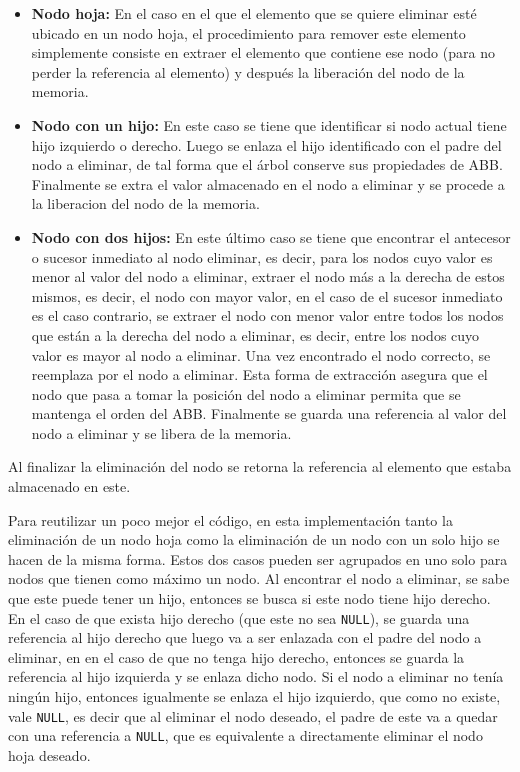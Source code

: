 \documentclass[titlepage,a4paper]{article}
\begin{document}
\begin{itemize}
	\item \textbf{Nodo hoja:} En el caso en el que el elemento que
			se quiere eliminar esté ubicado en un nodo hoja, el procedimiento para
			remover este elemento simplemente consiste en extraer el elemento que
			contiene ese nodo (para no perder la referencia al elemento) y después
			la liberación del nodo de la memoria.
		\item \textbf{Nodo con un hijo:} En este caso se tiene que identificar si
			nodo actual tiene hijo izquierdo o derecho. Luego se enlaza el hijo
			identificado con el padre del nodo a eliminar, de tal forma que el árbol
			conserve sus propiedades de ABB. Finalmente se extra el valor almacenado
			en el nodo a eliminar y se procede a la liberacion del nodo de la memoria.
		\item \textbf{Nodo con dos hijos:} En este último caso se tiene que
			encontrar el antecesor o sucesor inmediato al nodo eliminar, es decir,
			para los nodos cuyo valor es menor al valor del nodo a eliminar, extraer
			el nodo más a la derecha de estos mismos, es decir, el nodo con mayor
			valor, en el caso de el sucesor inmediato es el caso contrario, se
			extraer el nodo con menor valor entre todos los nodos que están a la
			derecha del nodo a eliminar, es decir, entre los nodos cuyo valor es mayor
			al nodo a eliminar. Una vez encontrado el nodo correcto, se reemplaza
			por el nodo a eliminar. Esta forma de extracción asegura que el nodo que
			pasa a tomar la posición del nodo a eliminar permita que se mantenga el
			orden del ABB. Finalmente se guarda una referencia al valor del nodo a
			eliminar y se libera de la memoria.
\end{itemize}

Al finalizar la eliminación del nodo se retorna la referencia al elemento que
estaba almacenado en este.

Para reutilizar un poco mejor el código, en esta implementación tanto la
eliminación de un nodo hoja como la eliminación de un nodo con un solo hijo se
hacen de la misma forma. Estos dos casos pueden ser agrupados en uno solo para
nodos que tienen como máximo un nodo. Al encontrar el nodo a eliminar, se sabe
que este puede tener un hijo, entonces se busca si este nodo tiene hijo derecho.
En el caso de que exista hijo derecho (que este no sea \lstinline{NULL}), se
guarda una referencia al hijo derecho que luego va a ser enlazada con el padre
del nodo a eliminar, en en el caso de que no tenga hijo derecho, entonces se 
guarda la referencia al hijo izquierda y se enlaza dicho nodo. Si el nodo a
eliminar no tenía ningún hijo, entonces igualmente se enlaza el hijo izquierdo,
que como no existe, vale \lstinline{NULL}, es decir que al eliminar el nodo
deseado, el padre de este va a quedar con una referencia a \lstinline{NULL},
que es equivalente a directamente eliminar el nodo hoja deseado.
\end{document}
